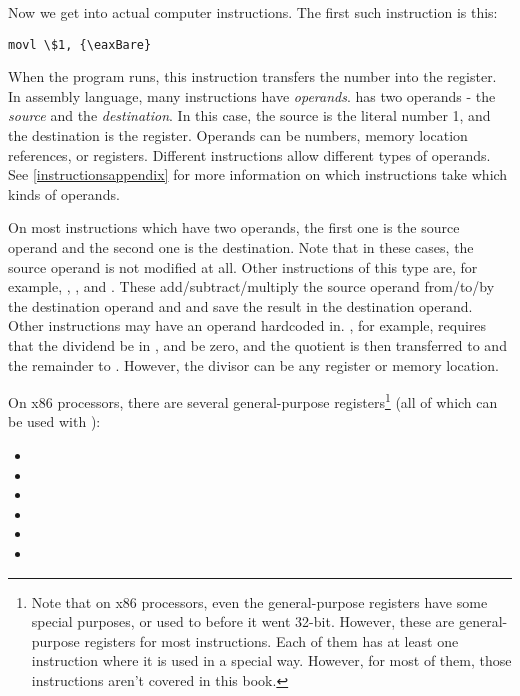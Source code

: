 Now we get into actual computer instructions.  The first such instruction is this:

\begin{simpletyping}
\begin{lstlisting}
movl \$1, {\eaxBare}
\end{lstlisting}
\end{simpletyping}

When the program runs, this instruction transfers 
the number  into the {\eaxReg} register.  In assembly language,
many instructions have \emph{operands}.   has two operands - 
the \emph{source} and the \emph{destination}.  In
this case, the source is the literal number 1, and the destination is the
{\eaxReg} register.  Operands can be numbers, memory location references, or
registers.  Different instructions allow different types of operands.  See
\autoref{instructionsappendix} for more information on which 
instructions take which kinds of operands.

On most instructions which
have two operands, the first one is the source operand and the second one
is the destination.  Note that in these cases, the source operand is not
modified at all.  Other instructions of this type are, for example,
, 
, and  
.
These add/subtract/multiply
the source operand from/to/by the destination operand and and save the result
in the destination operand.  Other instructions may have an operand hardcoded
in.  , 
for example, requires that the dividend be
in {\eaxReg}, and {\edxReg} be zero, and the quotient is then transferred to {\eaxReg}
and the remainder to {\edxReg}.  However, the divisor can be any register or 
memory location.

On x86 processors, there are several general-purpose registers\footnote{Note that on x86 processors, even the general-purpose registers have some special purposes, or used to before it went 32-bit.  However, these are general-purpose registers for most instructions.  Each of them has at least one instruction where it is used in a special way.  However, for most of them, those instructions aren't covered in this book.}
 (all of which can be used with ):

\begin{itemize}\item {\eaxRegIdx} 
\item {\ebxRegIdx} 
\item {\ecxRegIdx} 
\item {\edxRegIdx} 
\item {\ediRegIdx} 
\item {\esiRegIdx} 
\end{itemize}

